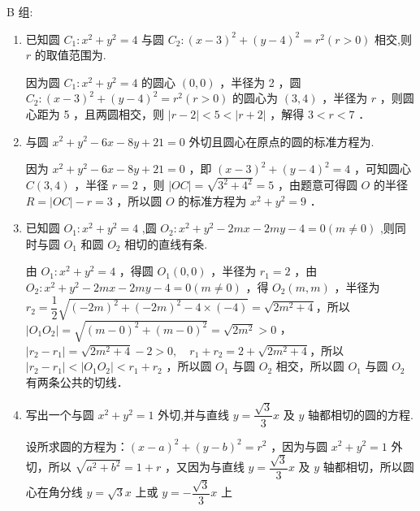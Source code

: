 B 组:

\begin{enumerate}
    \item 已知圆 ${C}_{1} : {x}^{2} + {y}^{2} = 4$ 与圆 ${C}_{2} : {\left( x - 3\right) }^{2} + {\left( y - 4\right) }^{2} = {r}^{2}\left( {r > 0}\right)$ 相交,则 $r$ 的取值范围为.
    \begin{jieda}
        因为圆 $C_1: x^2+y^2=4$ 的圆心 $(0,0)$ ，半径为 2 ，圆 $C_2:(x-3)^2+(y-4)^2=r^2(r>0)$ 的圆心为 $(3,4)$ ，半径为 $r$ ，则圆心距为 5 ，且两圆相交，则 $|r-2|<5<|r+2|$ ，解得 $3<r<7$ ．
    \end{jieda}
    
    \item 与圆 ${x}^{2} + {y}^{2} - {6x} - {8y} + {21} = 0$ 外切且圆心在原点的圆的标准方程为.
    \begin{jieda}
        因为 $x^2+y^2-6 x-8 y+21=0$ ，即 $(x-3)^2+(y-4)^2=4$ ，可知圆心 $C(3,4)$ ，半径 $r=2$ ，则 $|O C|=\sqrt{3^2+4^2}=5$ ，由题意可得圆 $O$ 的半径 $R=|O C|-r=3$ ，所以圆 $O$ 的标准方程为 $x^2+y^2=9$ ．
    \end{jieda}

    \item 已知圆 ${O}_{1} : {x}^{2} + {y}^{2} = 4$ ,圆 ${O}_{2} : {x}^{2} + {y}^{2} - {2mx} - {2my} - 4 = 0\left( {m \neq  0}\right)$ ,则同时与圆 ${O}_{1}$ 和圆 ${O}_{2}$ 相切的直线有条.
    \begin{jieda}
        由 $O_1: x^2+y^2=4$ ，得圆 $O_1(0,0)$ ，半径为 $r_1=2$ ，由 $O_2: x^2+y^2-2 m x-2 m y-4=0(m \neq 0)$ ，得 $O_2(m, m)$ ，半径为$r_2=\dfrac{1}{2} \sqrt{(-2 m)^2+(-2 m)^2-4 \times(-4)}=\sqrt{2 m^2+4}$，所以 $\left|O_1 O_2\right|=\sqrt{(m-0)^2+(m-0)^2}=\sqrt{2 m^2}>0$ ，$\left|r_2-r_1\right|=\sqrt{2 m^2+4}-2>0, \quad r_1+r_2=2+\sqrt{2 m^2+4}$，所以 $\left|r_2-r_1\right|<\left|O_1 O_2\right|<r_1+r_2$ ，所以圆 $O_1$ 与圆 $O_2$ 相交，所以圆 ${O}_1$ 与圆 ${O}_2$ 有两条公共的切线．

    \end{jieda}

    
    \item 写出一个与圆 ${x}^{2} + {y}^{2} = 1$ 外切,并与直线 $y = \dfrac{\sqrt{3}}{3}x$ 及 $y$ 轴都相切的圆的方程.
    \begin{jieda}
        设所求圆的方程为：$(x-a)^2+(y-b)^2=r^2$ ，因为与圆 $x^2+y^2=1$ 外切，所以 $\sqrt{a^2+b^2}=1+r$ ，又因为与直线 $y=\dfrac{\sqrt{3}}{3} x$ 及 $y$ 轴都相切，所以圆心在角分线 $y=\sqrt{3} x$ 上或 $y=-\dfrac{\sqrt{3}}{3} x$ 上
\end{jieda}
\end{enumerate}
